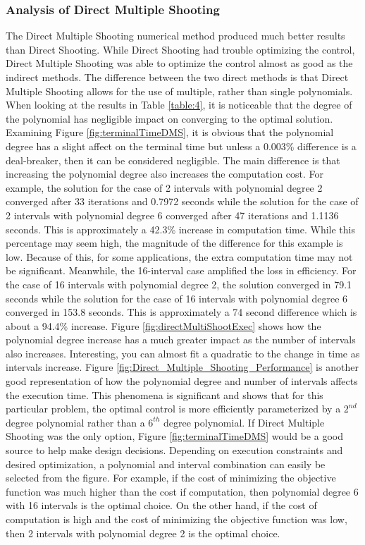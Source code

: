 \documentclass[]{article}
\begin{document}
\subsubsection{Analysis of Direct Multiple Shooting}
The Direct Multiple Shooting numerical method produced much better results than Direct Shooting. While Direct Shooting had trouble optimizing the control, Direct Multiple Shooting was able to optimize the control almost as good as the indirect methods. The difference between the two direct methods is that Direct Multiple Shooting allows for the use of multiple, rather than single polynomials. When looking at the results in Table \ref{table:4}, it is noticeable that the degree of the polynomial has negligible impact on converging to the optimal solution. Examining Figure \ref{fig:terminalTimeDMS}, it is obvious that the polynomial degree has a slight affect on the terminal time but unless a 0.003\% difference is a deal-breaker, then it can be considered negligible. The main difference is that increasing the polynomial degree also increases the computation cost. For example, the solution for the case of 2 intervals with polynomial degree 2 converged after 33 iterations and 0.7972 seconds while the solution for the case of 2 intervals with polynomial degree 6 converged after 47 iterations and 1.1136 seconds. This is approximately a 42.3\% increase in computation time. While this percentage may seem high, the magnitude of the difference for this example is low. Because of this, for some applications, the extra computation time may not be significant. Meanwhile, the 16-interval case amplified the loss in efficiency. For the case of 16 intervals with polynomial degree 2, the solution converged in 79.1 seconds while the solution for the case of 16 intervals with polynomial degree 6 converged in 153.8 seconds. This is approximately a 74 second difference which is about a 94.4\% increase. Figure \ref{fig:directMultiShootExec} shows how the polynomial degree increase has a much greater impact as the number of intervals also increases. Interesting, you can almost fit a quadratic to the change in time as intervals increase. Figure \ref{fig:Direct_Multiple_Shooting_Performance} is another good representation of how the polynomial degree and number of intervals affects the execution time. This phenomena is significant and shows that for this particular problem, the optimal control is more efficiently parameterized by a \(2^{nd}\) degree polynomial rather than a \(6^{th}\) degree polynomial. If Direct Multiple Shooting was the only option, Figure \ref{fig:terminalTimeDMS} would be a good source to help make design decisions. Depending on execution constraints and desired optimization, a polynomial and interval combination can easily be selected from the figure. For example, if the cost of minimizing the objective function was much higher than the cost if computation, then polynomial degree 6 with 16 intervals is the optimal choice. On the other hand, if the cost of computation is high and the cost of minimizing the objective function was low, then 2 intervals with polynomial degree 2 is the optimal choice. 
\end{document}
